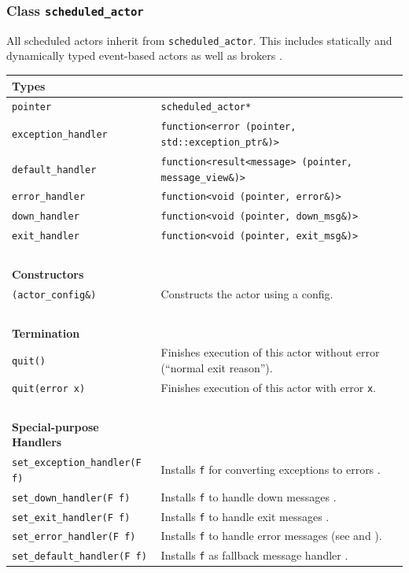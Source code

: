 \clearpage
\subsubsection{Class \lstinline^scheduled_actor^}

All scheduled actors inherit from \lstinline^scheduled_actor^. This includes statically and dynamically typed event-based actors as well as brokers .

\begin{center}
\small
\begin{tabular}{ll}
  \textbf{Types} & ~ \\
  \hline
  \lstinline^pointer^ & \lstinline^scheduled_actor*^ \\
  \hline
  \lstinline^exception_handler^ & \lstinline^function<error (pointer, std::exception_ptr&)>^ \\
  \hline
  \lstinline^default_handler^ & \lstinline^function<result<message> (pointer, message_view&)>^ \\
  \hline
  \lstinline^error_handler^ & \lstinline^function<void (pointer, error&)>^ \\
  \hline
  \lstinline^down_handler^ & \lstinline^function<void (pointer, down_msg&)>^ \\
  \hline
  \lstinline^exit_handler^ & \lstinline^function<void (pointer, exit_msg&)>^ \\
  \hline
  ~ & ~ \\ \textbf{Constructors} & ~ \\
  \hline
  \lstinline^(actor_config&)^ & Constructs the actor using a config. \\
  \hline
  ~ & ~ \\ \textbf{Termination} & ~ \\
  \hline
  \lstinline^quit()^ & Finishes execution of this actor without error (``normal exit reason''). \\
  \hline
  \lstinline^quit(error x)^ & Finishes execution of this actor with error \lstinline^x^. \\
  \hline
  ~ & ~ \\ \textbf{Special-purpose Handlers} & ~ \\
  \hline
  \lstinline^set_exception_handler(F f)^ & Installs \lstinline^f^ for converting exceptions to errors . \\
  \hline
  \lstinline^set_down_handler(F f)^ & Installs \lstinline^f^ to handle down messages . \\
  \hline
  \lstinline^set_exit_handler(F f)^ & Installs \lstinline^f^ to handle exit messages . \\
  \hline
  \lstinline^set_error_handler(F f)^ & Installs \lstinline^f^ to handle error messages (see  and ). \\
  \hline
  \lstinline^set_default_handler(F f)^ & Installs \lstinline^f^ as fallback message handler . \\
  \hline
\end{tabular}
\end{center}

